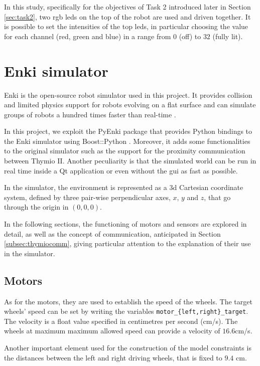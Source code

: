 In this study, specifically for the objectives of Task 2 introduced later in Section 
\ref{sec:task2}, two \gls{rgb} \glspl{led} on the top of the robot are used and 
driven together.
It is possible to set the intensities of the top \glspl{led}, in particular choosing the 
value for each channel (red, green and blue) in a range from $0$ (off) to $32$ 
(fully lit).

\section{Enki simulator}
\label{sec:enki}

Enki is the open-source robot simulator used in this project. It provides collision 
and limited physics support for robots evolving on a flat surface and can simulate 
groups of robots a hundred times faster than real-time \cite[][]{enki}.

In this project, we exploit the PyEnki package \cite[][]{enki-jguzzi} that provides 
Python bindings to the Enki simulator using Boost::Python 
\cite[][]{boostpython}.
Moreover, it adds some functionalities to the original simulator such as the 
support for the proximity communication between Thymio II.
Another peculiarity is that the simulated world can be run in real time inside a Qt 
application or even without the \gls{gui} as fast as possible.

In the simulator, the environment is represented as a \gls{3d} Cartesian 
coordinate system, defined by three pair-wise perpendicular axes, $x$, $y$ and 
$z$, that go through the origin in $(0, 0, 0)$. 

In the following sections, the functioning of motors and sensors are explored in 
detail, as well as the concept of communication, anticipated in Section 
\ref{subsec:thymiocomm}, giving particular attention to the explanation of their 
use in the simulator.

\subsection{Motors}
\label{subsec:enkimotors}
As for the motors, they are used to establish the speed of the wheels. The target 
wheels' speed can be set by writing the variables 
\texttt{motor\_\{left,right\}\_target}. The velocity is a float value specified in 
centimetres per second (\gls{cm/s}).
The wheels at maximum maximum allowed speed can provide a velocity of 
$16.6$\gls{cm/s}.

Another important element used for the construction of the model constraints is 
the distances between the left and right driving wheels, that is fixed to $9.4$ 
\gls{cm}.

